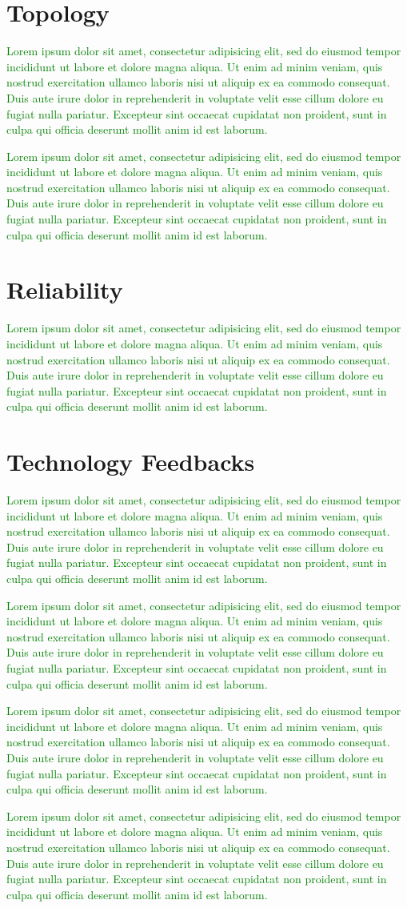 \documentclass{sig-alternate}
\newcommand{\lorem}               {\textcolor{green}{Lorem ipsum dolor sit amet, consectetur adipisicing elit, sed do eiusmod tempor incididunt ut labore et dolore magna aliqua. Ut enim ad minim veniam, quis nostrud exercitation ullamco laboris nisi ut aliquip ex ea commodo consequat. Duis aute irure dolor in reprehenderit in voluptate velit esse cillum dolore eu fugiat nulla pariatur. Excepteur sint occaecat cupidatat non proident, sunt in culpa qui officia deserunt mollit anim id est laborum.}}
\begin{document}
\section{Topology}
\label{sec:topology}


\lorem


\lorem


\section{Reliability}
\label{sec:reliability}


\lorem


\section{Technology Feedbacks}
\label{sec:technology}


\lorem


\lorem


\lorem


\lorem






\end{document}
